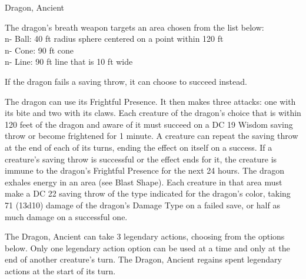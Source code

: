 \begin{DndMonster}[float*=b,width=\textwidth + 8pt]{Dragon, Ancient}
\begin{multicols}{2}
 The dragon's breath weapon targets an area chosen from the list below:\\n- Ball: 40 ft radius sphere centered on a point within 120 ft\\n- Cone: 90 ft cone\\n- Line: 90 ft line that is 10 ft wide

 If the dragon fails a saving throw, it can choose to succeed instead.

 The dragon can use its Frightful Presence. It then makes three attacks: one with its bite and two with its claws.
\DndMonsterAttack[
	name=Bite,
	distance=melee,
	type=weapon,
	mod=+15,
	reach=15,
	dmg=\DndDice{2d10 + 8},
	dmg-type=piercing,
	extra={ plus 9 (2d8) damage of the dragon's Damage Type.}
]
\DndMonsterAttack[
	name=Claw,
	distance=melee,
	type=weapon,
	mod=+15,
	reach=10,
	dmg=\DndDice{2d6 + 8},
	dmg-type=slashing
]
\DndMonsterAttack[
	name=Tail,
	distance=melee,
	type=weapon,
	mod=+15,
	reach=20,
	dmg=\DndDice{2d8 + 8},
	dmg-type=bludgeoning
]
Each creature of the dragon’s choice that is within 120 feet of the dragon and aware of it must succeed on a DC 19 Wisdom saving throw or become frightened for 1 minute. A creature can repeat the saving throw at the end of each of its turns, ending the effect on itself on a success. If a creature’s saving throw is successful or the effect ends for it, the creature is immune to the dragon’s Frightful Presence for the next 24 hours.
The dragon exhales energy in an area (see Blast Shape). Each creature in that area must make a DC 22 saving throw of the type indicated for the dragon's color, taking 71 (13d10) damage of the dragon's Damage Type on a failed save, or half as much damage on a successful one.

The Dragon, Ancient can take 3 legendary actions, choosing from the options below. Only one legendary action option can be used at a time and only at the end of another creature's turn. The Dragon, Ancient regains spent legendary actions at the start of its turn.
\begin{DndMonsterLegendaryActions}
\end{DndMonsterLegendaryActions}

\end{multicols}
\end{DndMonster}
